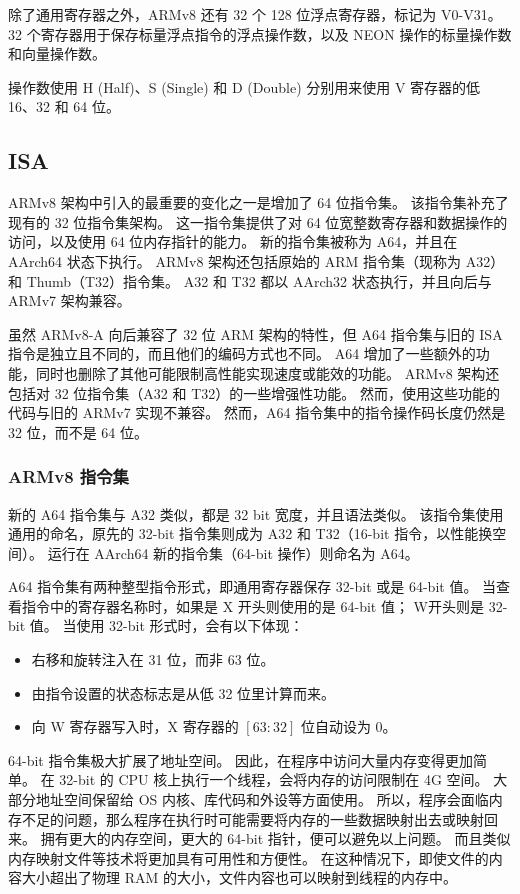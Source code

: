 除了通用寄存器之外，ARMv8 还有 32 个 128 位浮点寄存器，标记为 V0-V31。
32 个寄存器用于保存标量浮点指令的浮点操作数，以及 NEON 操作的标量操作数和向量操作数。

操作数使用 H (Half)、S (Single) 和 D (Double) 分别用来使用 V 寄存器的低 16、32 和 64 位。

\subsection{ISA}

ARMv8 架构中引入的最重要的变化之一是增加了 64 位指令集。
该指令集补充了现有的 32 位指令集架构。
这一指令集提供了对 64 位宽整数寄存器和数据操作的访问，以及使用 64 位内存指针的能力。
新的指令集被称为 A64，并且在 AArch64 状态下执行。
ARMv8 架构还包括原始的 ARM 指令集（现称为 A32）和 Thumb（T32）指令集。
A32 和 T32 都以 AArch32 状态执行，并且向后与 ARMv7 架构兼容。

虽然 ARMv8-A 向后兼容了 32 位 ARM 架构的特性，但 A64 指令集与旧的 ISA 指令是独立且不同的，而且他们的编码方式也不同。
A64 增加了一些额外的功能，同时也删除了其他可能限制高性能实现速度或能效的功能。
ARMv8 架构还包括对 32 位指令集（A32 和 T32）的一些增强性功能。
然而，使用这些功能的代码与旧的 ARMv7 实现不兼容。
然而，A64 指令集中的指令操作码长度仍然是 32 位，而不是 64 位。

\subsubsection{ARMv8 指令集}

新的 A64 指令集与 A32 类似，都是 32 bit 宽度，并且语法类似。
该指令集使用通用的命名，原先的 32-bit 指令集则成为 A32 和 T32（16-bit 指令，以性能换空间）。
运行在 AArch64 新的指令集（64-bit 操作）则命名为 A64。

A64 指令集有两种整型指令形式，即通用寄存器保存 32-bit 或是 64-bit 值。
当查看指令中的寄存器名称时，如果是 X 开头则使用的是 64-bit 值；
W开头则是 32-bit 值。
当使用 32-bit 形式时，会有以下体现：
\begin{itemize}
  \item 右移和旋转注入在 31 位，而非 63 位。
  \item 由指令设置的状态标志是从低 32 位里计算而来。
  \item 向 W 寄存器写入时，X 寄存器的 $[63:32]$ 位自动设为 0。
\end{itemize}

64-bit 指令集极大扩展了地址空间。
因此，在程序中访问大量内存变得更加简单。
在 32-bit 的 CPU 核上执行一个线程，会将内存的访问限制在 4G 空间。
大部分地址空间保留给 OS 内核、库代码和外设等方面使用。
所以，程序会面临内存不足的问题，那么程序在执行时可能需要将内存的一些数据映射出去或映射回来。
拥有更大的内存空间，更大的 64-bit 指针，便可以避免以上问题。
而且类似内存映射文件等技术将更加具有可用性和方便性。
在这种情况下，即使文件的内容大小超出了物理 RAM 的大小，文件内容也可以映射到线程的内存中。

